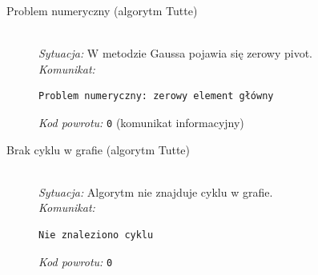 \documentclass[12pt]{article}
\begin{document}
\begin{description}
	\item[Problem numeryczny (algorytm Tutte)]
	      \hfill \\
	      \textit{Sytuacja:} W metodzie Gaussa pojawia się zerowy pivot. \\
	      \textit{Komunikat:}
	      \begin{verbatim}
Problem numeryczny: zerowy element główny
	      \end{verbatim}
	      \textit{Kod powrotu:} \texttt{0} (komunikat informacyjny)

	\item[Brak cyklu w grafie (algorytm Tutte)]
	      \hfill \\
	      \textit{Sytuacja:} Algorytm nie znajduje cyklu w grafie. \\
	      \textit{Komunikat:}
	      \begin{verbatim}
Nie znaleziono cyklu
	      \end{verbatim}
	      \textit{Kod powrotu:} \texttt{0}

\end{description}
\end{document}
